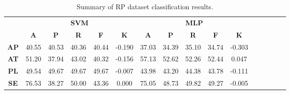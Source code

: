 \begin{landscape}
\begin{table}[htbp]
\footnotesize
\centering
\caption{Summary of RP dataset classification results.}
\label{tab:base_female}
\begin{tabular}{|c|c|c|c|c|c|c|c|c|c|c|c|c|c|c|c|}
\hline
\multirow{2}{*}{}	& \multicolumn{5}{c|}{\textbf{SVM}}												& \multicolumn{5}{c|}{\textbf{MLP}}												\\ \cline{2-11} 
					& \textbf{A}	& \textbf{P}	& \textbf{R}	& \textbf{F}	& \textbf{K}	& \textbf{A}	& \textbf{P}	& \textbf{R}	& \textbf{F}	& \textbf{K}	\\ \hline
\textbf{AP}			& 40.55			& 40.53			& 40.36			& 40.44			& -0.190			& 37.03			& 34.39			& 35.10			& 34.74			& -0.303			\\ \hline
\textbf{AT}			& 51.20			& 37.94			& 43.02			& 40.32			& -0.156			& 57.13			& 52.62			& 52.26			& 52.44			& 0.047			\\ \hline
\textbf{PL}			& 49.54			& 49.67			& 49.67			& 49.67			& -0.007			& 43.98			& 43.20			& 44.38			& 43.78			& -0.111			\\ \hline
\textbf{SE}			& 76.53			& 38.27			& 50.00			& 43.36			& 0.000			& 75.05			& 48.73			& 49.82			& 49.27			& -0.005			\\ \hline
\end{tabular}
\end{table}
\end{landscape}